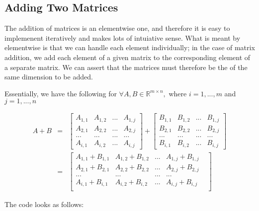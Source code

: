 \documentclass[12pt, a4paper]{article}
\begin{document}
\subsection{Adding Two Matrices}

The addition of matrices is an elementwise one, and therefore it is easy to implemenent iteratively and makes lots of intuiative sense. 
What is meant by elementwise is that we can handle each element individually; in the case of matrix addition, 
we add each element of a given matrix to the corresponding element of a separate matrix. We can assert that the matrices must 
therefore be the of the same dimension to be added. 

Essentially, we have the following for $ \forall A, B \in \mathbb{R}^{m\times n}, $ where $i = 1,...,m$  and $j = 1,...,n$      

\begin{eqnarray*}
    A + B & = & \begin{bmatrix}
        A_{1,1}  & A_{1,2} & ... & A_{1,j}\\
        A_{2,1} & A_{2,2} & ... & A_{2,j}\\
        ... & ... & ... & ... \\
        A_{i,1} & A_{i,2} & ... & A_{i,j}
    \end{bmatrix} + \begin{bmatrix}
        B_{1,1}  & B_{1,2} & ... & B_{1,j}\\
        B_{2,1} & B_{2,2} & ... & B_{2,j}\\
        ... & ... & ... & ... \\
        B_{i,1} & B_{i,2} & ... & B_{i,j}
    \end{bmatrix} \\
    & = & \begin{bmatrix}
        A_{1,1} + B_{1,1} & A_{1,2} + B_{1,2} & ... & A_{1,j} + B_{1,j} \\
        A_{2,1} + B_{2,1} & A_{2,2} + B_{2,2} & ... & A_{2,j} + B_{2,j} \\
        ... & ... & ... & ... & \\
        A_{i,1} + B_{i,1} & A_{i,2} + B_{i,2} & ... & A_{i,j} + B_{i,j} \\
    \end{bmatrix}
\end{eqnarray*}

The code looks as follows:
\end{document}

